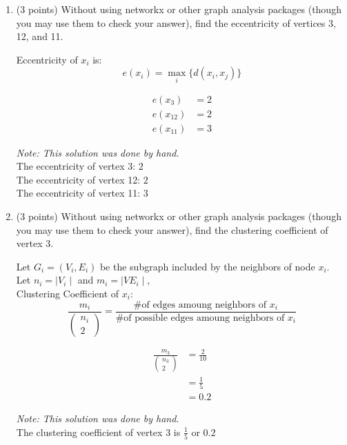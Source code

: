 \documentclass[11pt]{article}
\begin{document}
\begin{enumerate}
    \newpage
    \item (3 points) Without using networkx or other graph analysis packages
    (though you may use them to check your answer), find the eccentricity of
    vertices 3, 12, and 11.
    \begin{tcolorbox}[width=\linewidth,colback=yellow!5,colframe=yellow!75!black!75,title=Notes]
        Eccentricity of $x_i$ is: $$e(x_i) = \max_{i} \lbrace d( x_{i} , x_{j} ) \rbrace$$
    \end{tcolorbox}
    \begin{align*}
        e(x_3) &= 2 \\
        e(x_{12}) &= 2 \\
        e(x_{11}) &= 3
    \end{align*}
    \begin{tcolorbox}[width=\linewidth,title=Problem 2 Answer - Eccentricity]
        \textit{Note: This solution was done by hand.}\vspace{5pt} \\
        The eccentricity of vertex 3: $2$ \\
        The eccentricity of vertex 12: $2$ \\
        The eccentricity of vertex 11: $3$
    \end{tcolorbox}

    \newpage
    \item (3 points) Without using networkx or other graph analysis packages
    (though you may use them to check your answer), find the clustering
    coefficient of vertex 3.
    \begin{tcolorbox}[width=\linewidth,colback=yellow!5,colframe=yellow!75!black!75,title=Notes]
        Let $G_i = (V_i, E_i)$ be the subgraph included by the neighbors of node $x_i$. \\
        Let $n_i = \mid V_i \mid$ and $m_i = \mid VE_i \mid$, \\
        Clustering Coefficient of $x_i$:
        $$\frac{ m_{i} }{ ( \substack{ n_{i} \\ 2} ) } = \frac{ \text{\# of edges amoung neighbors of } x_{i} }{ \text{\# of possible edges amoung neighbors of } x_{i} }$$
    \end{tcolorbox}
    \begin{align*}
        \frac{ m_{3} }{ ( \substack{ n_{3} \\ 2} ) } &= \frac{2}{10} \\
        &= \frac{1}{5} \\
        &= 0.2
    \end{align*}
    \begin{tcolorbox}[width=\linewidth,title=Problem 3 Answer - Clustering Coefficient of $x_3$]
        \textit{Note: This solution was done by hand.}\vspace{5pt} \\
        The clustering coefficient of vertex 3 is $\frac{1}{5}$ or $0.2$
    \end{tcolorbox}


\end{enumerate}
\end{document}
